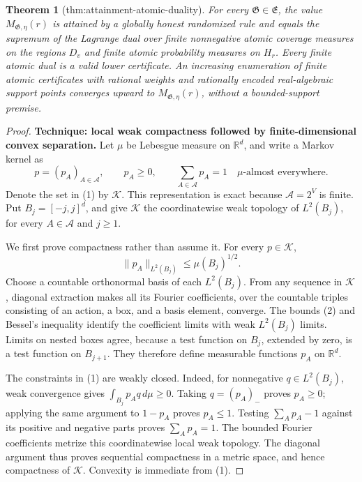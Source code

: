 \documentclass{article}
\newtheorem{theorem}{Theorem}
\begin{document}
\begin{theorem}[thm:attainment-atomic-duality]\label{thm:attainment-atomic-duality}
For every \(\mathfrak G\in\mathfrak E\), the value \(M_{\mathfrak G,\eta}(r)\) is attained by a globally honest randomized rule and equals the supremum of the Lagrange dual over finite nonnegative atomic coverage measures on the regions \(D_v\) and finite atomic probability measures on \(H_r\). Every finite atomic dual is a valid lower certificate. An increasing enumeration of finite atomic certificates with rational weights and rationally encoded real-algebraic support points converges upward to \(M_{\mathfrak G,\eta}(r)\), without a bounded-support premise.
\end{theorem}
\begin{proof}
\textbf{Technique: local weak compactness followed by finite-dimensional convex
separation.}
Let \(\mu\) be Lebesgue measure on \(\mathbb R^d\), and write a Markov
kernel as
\[
 p=(p_A)_{A\in\mathcal A},\qquad
 p_A\geq0,\qquad \sum_{A\in\mathcal A}p_A=1
 \quad\mu\text{-almost everywhere}.
\tag{1}
\]
Denote the set in (1) by \(\mathscr K\).  This representation is exact because
\(\mathcal A=2^V\) is finite.  Put \(B_j=[-j,j]^d\), and give
\(\mathscr K\) the coordinatewise weak topology of \(L^2(B_j)\), for every
\(A\in\mathcal A\) and \(j\geq1\).

We first prove compactness rather than assume it.  For every \(p\in\mathscr K\),
\[
 \|p_A\|_{L^2(B_j)}\leq\mu(B_j)^{1/2}.
\tag{2}
\]
Choose a countable orthonormal basis of each \(L^2(B_j)\).  From any sequence
in \(\mathscr K\), diagonal extraction makes all its Fourier coefficients,
over the countable triples consisting of an action, a box, and a basis
element, converge.  The bounds (2) and Bessel's inequality identify the
coefficient limits with weak \(L^2(B_j)\) limits.  Limits on nested boxes
agree, because a test function on \(B_j\), extended by zero, is a test
function on \(B_{j+1}\).  They therefore define measurable functions
\(p_A\) on \(\mathbb R^d\).

The constraints in (1) are weakly closed.  Indeed, for nonnegative
\(q\in L^2(B_j)\), weak convergence gives
\(\int_{B_j}p_Aq\,d\mu\geq0\).  Taking \(q=(p_A)_-\) proves
\(p_A\geq0\); applying the same argument to \(1-p_A\) proves \(p_A\leq1\).
Testing \(\sum_Ap_A-1\) against its positive and negative parts proves
\(\sum_Ap_A=1\).  The bounded Fourier coefficients metrize this
coordinatewise local weak topology.  The diagonal argument thus proves
sequential compactness in a metric space, and hence compactness of
\(\mathscr K\).  Convexity is immediate from (1).


\end{proof}
\end{document}
